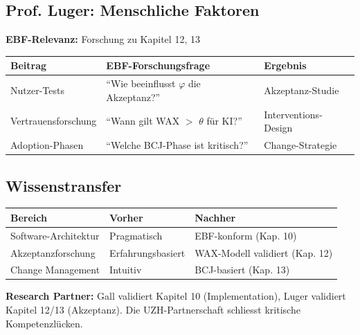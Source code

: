 \documentclass[11pt,a4paper]{article}
\begin{document}
\subsection{Prof. Luger: Menschliche Faktoren}

\begin{ebfbox}
\textbf{EBF-Relevanz:} Forschung zu Kapitel 12, 13
\end{ebfbox}

\begin{center}
\begin{tabular}{lll}
\toprule
\textbf{Beitrag} & \textbf{EBF-Forschungsfrage} & \textbf{Ergebnis} \\
\midrule
Nutzer-Tests & ``Wie beeinflusst $\varphi$ die Akzeptanz?'' & Akzeptanz-Studie \\
Vertrauensforschung & ``Wann gilt WAX $>$ $\theta$ für KI?'' & Interventions-Design \\
Adoption-Phasen & ``Welche BCJ-Phase ist kritisch?'' & Change-Strategie \\
\bottomrule
\end{tabular}
\end{center}

\subsection{Wissenstransfer}

\begin{center}
\begin{tabular}{lll}
\toprule
\textbf{Bereich} & \textbf{Vorher} & \textbf{Nachher} \\
\midrule
Software-Architektur & Pragmatisch & EBF-konform (Kap. 10) \\
Akzeptanzforschung & Erfahrungsbasiert & WAX-Modell validiert (Kap. 12) \\
Change Management & Intuitiv & BCJ-basiert (Kap. 13) \\
\bottomrule
\end{tabular}
\end{center}

\begin{summarybox}
\textbf{Research Partner:} Gall validiert Kapitel 10 (Implementation), Luger validiert Kapitel 12/13 (Akzeptanz). Die UZH-Partnerschaft schliesst kritische Kompetenzlücken.
\end{summarybox}

\newpage

\end{document}
